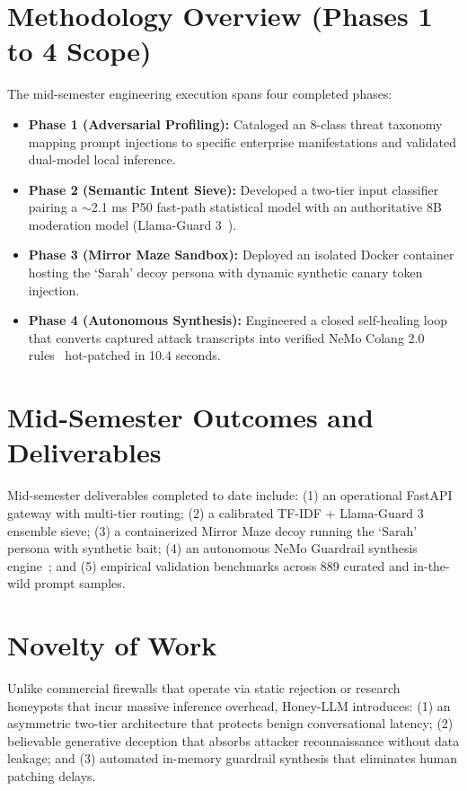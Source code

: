 \documentclass[12pt,a4paper,oneside]{report}
\begin{document}
\section{Methodology Overview (Phases 1 to 4 Scope)}
The mid-semester engineering execution spans four completed phases:
\begin{itemize}
    \item \textbf{Phase 1 (Adversarial Profiling):} Cataloged an 8-class threat taxonomy mapping prompt injections to specific enterprise manifestations and validated dual-model local inference.
    \item \textbf{Phase 2 (Semantic Intent Sieve):} Developed a two-tier input classifier pairing a $\sim$2.1 ms P50 fast-path statistical model with an authoritative 8B moderation model (Llama-Guard 3~\cite{llamaguard3}).
    \item \textbf{Phase 3 (Mirror Maze Sandbox):} Deployed an isolated Docker container hosting the `Sarah' decoy persona with dynamic synthetic canary token injection.
    \item \textbf{Phase 4 (Autonomous Synthesis):} Engineered a closed self-healing loop that converts captured attack transcripts into verified NeMo Colang 2.0 rules~\cite{nemo2024guardrails} hot-patched in 10.4 seconds.
\end{itemize}

\section{Mid-Semester Outcomes and Deliverables}
Mid-semester deliverables completed to date include: (1) an operational FastAPI gateway with multi-tier routing; (2) a calibrated TF-IDF + Llama-Guard 3~\cite{llamaguard3} ensemble sieve; (3) a containerized Mirror Maze decoy running the `Sarah' persona with synthetic bait; (4) an autonomous NeMo Guardrail synthesis engine~\cite{nemo2024guardrails}; and (5) empirical validation benchmarks across 889 curated and in-the-wild prompt samples.

\section{Novelty of Work}
Unlike commercial firewalls that operate via static rejection or research honeypots that incur massive inference overhead, Honey-LLM introduces: (1) an asymmetric two-tier architecture that protects benign conversational latency; (2) believable generative deception that absorbs attacker reconnaissance without data leakage; and (3) automated in-memory guardrail synthesis that eliminates human patching delays.
\end{document}
